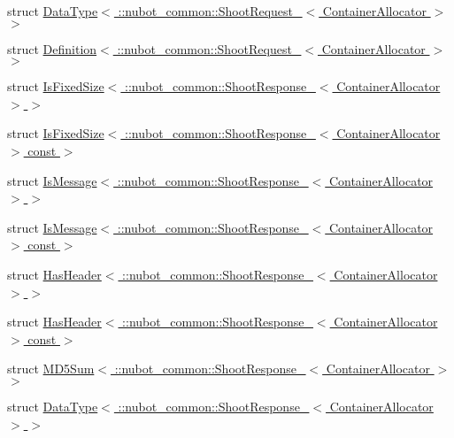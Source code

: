 \begin{DoxyCompactItemize}
struct \hyperlink{structros_1_1message__traits_1_1DataType_3_01_1_1nubot__common_1_1ShootRequest___3_01ContainerAllocator_01_4_01_4}{Data\-Type$<$ \-::nubot\-\_\-common\-::\-Shoot\-Request\-\_\-$<$ Container\-Allocator $>$ $>$}
\item 
struct \hyperlink{structros_1_1message__traits_1_1Definition_3_01_1_1nubot__common_1_1ShootRequest___3_01ContainerAllocator_01_4_01_4}{Definition$<$ \-::nubot\-\_\-common\-::\-Shoot\-Request\-\_\-$<$ Container\-Allocator $>$ $>$}
\item 
struct \hyperlink{structros_1_1message__traits_1_1IsFixedSize_3_01_1_1nubot__common_1_1ShootResponse___3_01ContainerAllocator_01_4_01_4}{Is\-Fixed\-Size$<$ \-::nubot\-\_\-common\-::\-Shoot\-Response\-\_\-$<$ Container\-Allocator $>$ $>$}
\item 
struct \hyperlink{structros_1_1message__traits_1_1IsFixedSize_3_01_1_1nubot__common_1_1ShootResponse___3_01Containc3f9054942697facaa3ace56b16aa7dd}{Is\-Fixed\-Size$<$ \-::nubot\-\_\-common\-::\-Shoot\-Response\-\_\-$<$ Container\-Allocator $>$ const  $>$}
\item 
struct \hyperlink{structros_1_1message__traits_1_1IsMessage_3_01_1_1nubot__common_1_1ShootResponse___3_01ContainerAllocator_01_4_01_4}{Is\-Message$<$ \-::nubot\-\_\-common\-::\-Shoot\-Response\-\_\-$<$ Container\-Allocator $>$ $>$}
\item 
struct \hyperlink{structros_1_1message__traits_1_1IsMessage_3_01_1_1nubot__common_1_1ShootResponse___3_01ContainerAllocator_01_4_01const_01_01_4}{Is\-Message$<$ \-::nubot\-\_\-common\-::\-Shoot\-Response\-\_\-$<$ Container\-Allocator $>$ const  $>$}
\item 
struct \hyperlink{structros_1_1message__traits_1_1HasHeader_3_01_1_1nubot__common_1_1ShootResponse___3_01ContainerAllocator_01_4_01_4}{Has\-Header$<$ \-::nubot\-\_\-common\-::\-Shoot\-Response\-\_\-$<$ Container\-Allocator $>$ $>$}
\item 
struct \hyperlink{structros_1_1message__traits_1_1HasHeader_3_01_1_1nubot__common_1_1ShootResponse___3_01ContainerAllocator_01_4_01const_01_01_4}{Has\-Header$<$ \-::nubot\-\_\-common\-::\-Shoot\-Response\-\_\-$<$ Container\-Allocator $>$ const  $>$}
\item 
struct \hyperlink{structros_1_1message__traits_1_1MD5Sum_3_01_1_1nubot__common_1_1ShootResponse___3_01ContainerAllocator_01_4_01_4}{M\-D5\-Sum$<$ \-::nubot\-\_\-common\-::\-Shoot\-Response\-\_\-$<$ Container\-Allocator $>$ $>$}
\item 
struct \hyperlink{structros_1_1message__traits_1_1DataType_3_01_1_1nubot__common_1_1ShootResponse___3_01ContainerAllocator_01_4_01_4}{Data\-Type$<$ \-::nubot\-\_\-common\-::\-Shoot\-Response\-\_\-$<$ Container\-Allocator $>$ $>$}

\end{DoxyCompactItemize}
